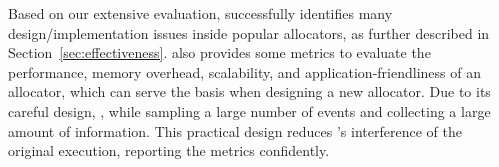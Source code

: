 

Based on our extensive evaluation, \MP{} successfully identifies many design/implementation issues inside popular allocators, as further described in Section~\ref{sec:effectiveness}. \MP{} also provides some metrics to evaluate the performance, memory overhead, scalability, and application-friendliness of an allocator, which can serve the basis when designing a new allocator. Due to its careful design, , while sampling a large number of events and collecting a large amount of information. This practical design reduces \MP{}'s interference of the original execution, reporting the metrics confidently. 

